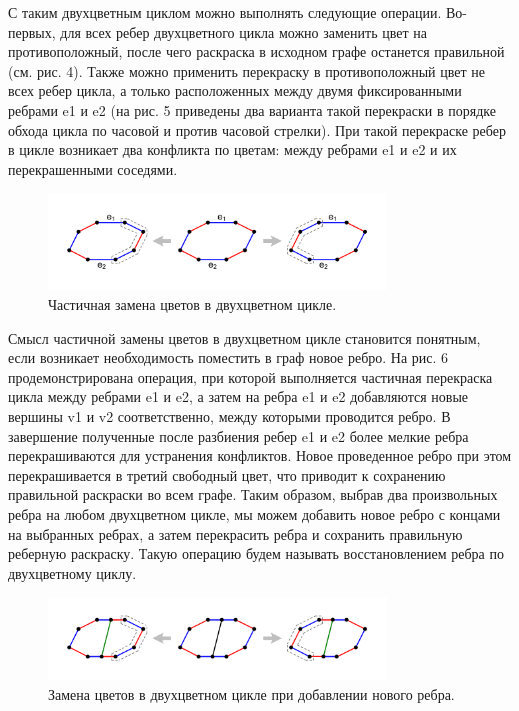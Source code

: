 С таким двухцветным циклом можно выполнять следующие операции.
Во-первых, для всех ребер двухцветного цикла можно заменить цвет на противоположный, после чего раскраска в исходном графе останется правильной (см. рис. 4).
Также можно применить перекраску в противоположный цвет не всех ребер цикла, а только расположенных между двумя фиксированными ребрами e1 и e2 (на рис. 5 приведены два варианта такой перекраски в порядке обхода цикла по часовой и против часовой стрелки).
При такой перекраске ребер в цикле возникает два конфликта по цветам: между ребрами e1 и e2 и их перекрашенными соседями.

\begin{figure}[ht]
\centering
\includegraphics[width=0.8\textwidth]{./pics/text_3_edge_coloring/5-bicolor-cycle-partial-switch.pdf}
\singlespacing
{}\caption{Частичная замена цветов в двухцветном цикле.}
\label{fig:text_3_edge_coloring_5}
\end{figure}

Смысл частичной замены цветов в двухцветном цикле становится понятным, если возникает необходимость поместить в граф новое ребро.
На рис. 6 продемонстрирована операция, при которой выполняется частичная перекраска цикла между ребрами e1 и e2, а затем на ребра e1 и e2 добавляются новые вершины v1 и v2 соответственно, между которыми проводится ребро.
В завершение полученные после разбиения ребер e1 и e2 более мелкие ребра перекрашиваются для устранения конфликтов.
Новое проведенное ребро при этом перекрашивается в третий свободный цвет, что приводит к сохранению правильной раскраски во всем графе.
Таким образом, выбрав два произвольных ребра на любом двухцветном цикле, мы можем добавить новое ребро с концами на выбранных ребрах, а затем перекрасить ребра и сохранить правильную реберную раскраску.
Такую операцию будем называть восстановлением ребра по двухцветному циклу.

\begin{figure}[ht]
\centering
\includegraphics[width=0.8\textwidth]{./pics/text_3_edge_coloring/6-bicolor-cycle-new-edge.pdf}
\singlespacing
{}\caption{Замена цветов в двухцветном цикле при добавлении нового ребра.}
\label{fig:text_3_edge_coloring_6}
\end{figure}

